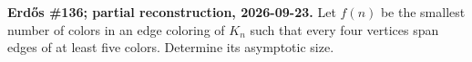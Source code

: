 \textbf{Erd\H{o}s \#136; partial reconstruction, 2026-09-23.}
Let $f(n)$ be the smallest number of colors in an edge coloring of
$K_n$ such that every four vertices span edges of at least five colors.
Determine its asymptotic size.
